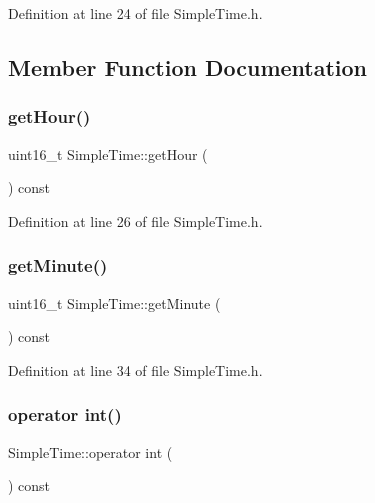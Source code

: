 Definition at line 24 of file Simple\+Time.\+h.



\subsection{Member Function Documentation}
\mbox{\label{class_simple_time_a386922a41d88aaab69497730b163cadf}} 
\subsubsection{\texorpdfstring{getHour()}{getHour()}}
{\footnotesize\ttfamily uint16\+\_\+t Simple\+Time\+::get\+Hour (\begin{DoxyParamCaption}{ }\end{DoxyParamCaption}) const\hspace{0.3cm}{\ttfamily [inline]}}



Definition at line 26 of file Simple\+Time.\+h.

\mbox{\label{class_simple_time_a02c7df278fb87be73998306330198018}} 
\subsubsection{\texorpdfstring{getMinute()}{getMinute()}}
{\footnotesize\ttfamily uint16\+\_\+t Simple\+Time\+::get\+Minute (\begin{DoxyParamCaption}{ }\end{DoxyParamCaption}) const\hspace{0.3cm}{\ttfamily [inline]}}



Definition at line 34 of file Simple\+Time.\+h.

\mbox{\label{class_simple_time_a9d034d06249024ed0366c99029243168}} 
\subsubsection{\texorpdfstring{operator int()}{operator int()}}
{\footnotesize\ttfamily Simple\+Time\+::operator int (\begin{DoxyParamCaption}{ }\end{DoxyParamCaption}) const\hspace{0.3cm}{\ttfamily [inline]}}



